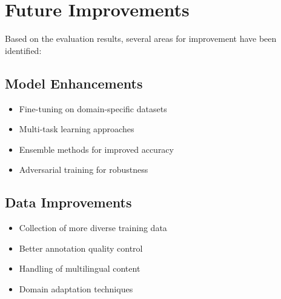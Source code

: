 
\section{Future Improvements}

Based on the evaluation results, several areas for improvement have been identified:

\subsection{Model Enhancements}
\begin{itemize}
\item Fine-tuning on domain-specific datasets
\item Multi-task learning approaches
\item Ensemble methods for improved accuracy
\item Adversarial training for robustness
\end{itemize}

\subsection{Data Improvements}
\begin{itemize}
\item Collection of more diverse training data
\item Better annotation quality control
\item Handling of multilingual content
\item Domain adaptation techniques
\end{itemize}

